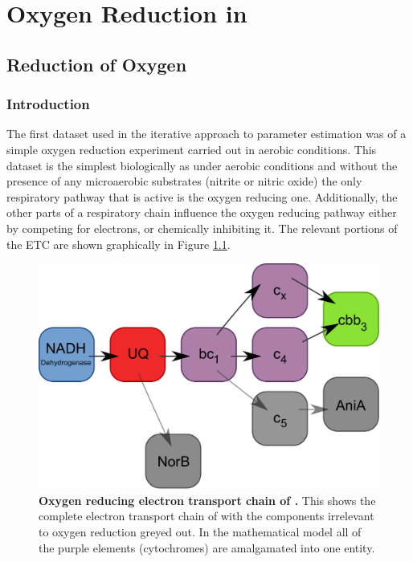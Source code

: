 \chapter{Oxygen Reduction in \Nm{}}
\label{chap:oxygenreduction}
\section{Reduction of Oxygen}
\subsection{Introduction}
The first dataset used in the iterative approach to parameter estimation was of a simple oxygen reduction experiment carried out in aerobic conditions. This dataset is the simplest biologically as under aerobic conditions and without the presence of any microaerobic substrates (nitrite or nitric oxide) the only respiratory pathway that is active is the oxygen reducing one. Additionally, the other parts of a respiratory chain influence the oxygen reducing pathway either by competing for electrons, or chemically inhibiting it. The relevant portions of the ETC are shown graphically in Figure \ref{fig:o2_resp_chain}.

\begin{figure}[tbp]
	\centering
	\includegraphics[width=14cm]{05-oxygenreduction/data/o2_resp_chain.pdf}
	\caption[Oxygen reducing electron transport chain of \Nm{}]{{\bf Oxygen reducing electron transport chain of \Nm{}.} This shows the complete electron transport chain of \Nsm{} with the components irrelevant to oxygen reduction greyed out. In the mathematical model all of the purple elements (cytochromes) are amalgamated into one entity.
	\label{fig:o2_resp_chain}}
\end{figure}

